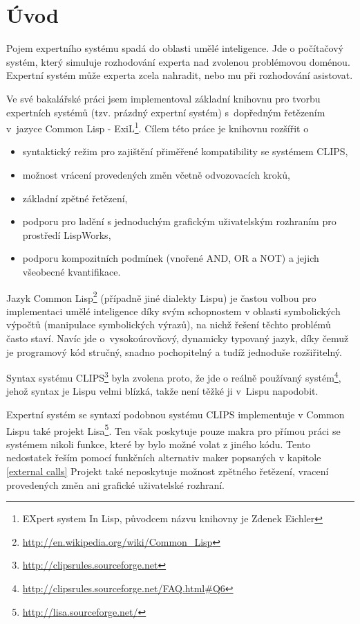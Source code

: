 \section{Úvod}

Pojem expertního systému spadá do oblasti umělé inteligence. Jde o počítačový
systém, který simuluje rozhodování experta nad zvolenou problémovou doménou.
Expertní systém může experta zcela nahradit, nebo mu při rozhodování asistovat.

Ve své bakalářské práci \cite{bakalarka} jsem implementoval základní knihovnu
pro tvorbu expertních systémů (tzv. prázdný expertní systém) s~dopředným
řetězením v~jazyce Common Lisp - ExiL\footnote{EXpert system In Lisp, původcem
  názvu knihovny je Zdenek Eichler}. Cílem této práce je knihovnu rozšířit o
\begin{itemize}
  \item syntaktický režim pro zajištění přiměřené kompatibility se systémem
    CLIPS,
  \item možnost vrácení provedených změn včetně odvozovacích kroků,
  \item základní zpětné řetězení,
  \item podporu pro ladění s jednoduchým grafickým uživatelským rozhraním pro
    prostředí LispWorks\texttrademark,
  \item podporu kompozitních podmínek (vnořené AND, OR a NOT) a jejich všeobecné
    kvantifikace.
\end{itemize}

Jazyk Common Lisp\footnote{\url{http://en.wikipedia.org/wiki/Common\_Lisp}}
(případně jiné dialekty Lispu) je častou volbou pro implementaci umělé
inteligence díky svým schopnostem v oblasti symbolických výpočtů (manipulace
symbolických výrazů), na nichž řešení těchto problémů často staví. Navíc jde
o~vysokoúrovňový, dynamicky typovaný jazyk, díky čemuž je programový kód
stručný, snadno pochopitelný a tudíž jednoduše rozšiřitelný.

Syntax systému CLIPS\footnote{\url{http://clipsrules.sourceforge.net}} byla
zvolena proto, že jde o reálně používaný
systém\footnote{\url{http://clipsrules.sourceforge.net/FAQ.html\#Q6}}, jehož
syntax je Lispu velmi blízká, takže není těžké ji v~Lispu napodobit.

Expertní systém se syntaxí podobnou systému CLIPS implementuje v Common Lispu
také projekt Lisa\footnote{\url{http://lisa.sourceforge.net/}}. Ten však
poskytuje pouze makra pro přímou práci se systémem nikoli funkce, které by bylo
možné volat z jiného kódu. Tento nedostatek řeším pomocí funkčních alternativ
maker popsaných v kapitole \ref{external calls} Projekt také neposkytuje možnost
zpětného řetězení, vracení provedených změn ani grafické uživatelské rozhraní.

